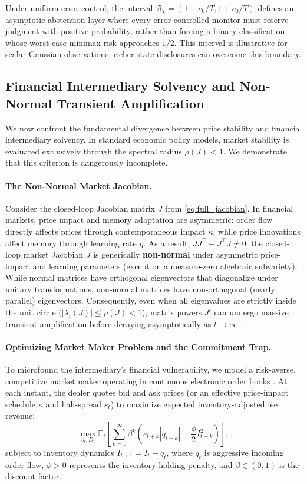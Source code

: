\documentclass[12pt]{article}
\theoremstyle{definition}
\theoremstyle{remark}
\begin{document}
Under uniform error control, the interval $\mathcal{B}_T = (1 - c_0/T, 1 + c_0/T)$ defines an asymptotic abstention layer where every error-controlled monitor must reserve judgment with positive probability, rather than forcing a binary classification whose worst-case minimax risk approaches $1/2$. This interval is illustrative for scalar Gaussian observations; richer state disclosures can overcome this boundary.\label{fig:abstention_zone}
\subsection{Financial Intermediary Solvency and Non-Normal Transient Amplification}
We now confront the fundamental divergence between price stability and financial intermediary solvency. In standard economic policy models, market stability is evaluated exclusively through the spectral radius $\rho(J) < 1$. We demonstrate that this criterion is dangerously incomplete.

\paragraph{The Non-Normal Market Jacobian.}
Consider the closed-loop Jacobian matrix $J$ from \eqref{eq:full_jacobian}. In financial markets, price impact and memory adaptation are asymmetric: order flow directly affects prices through contemporaneous impact $\kappa$, while price innovations affect memory through learning rate $\eta$. As a result, $J J^\top - J^\top J \neq 0$: the closed-loop market Jacobian $J$ is generically \textbf{non-normal} under asymmetric price-impact and learning parameters (except on a measure-zero algebraic subvariety). While normal matrices have orthogonal eigenvectors that diagonalize under unitary transformations, non-normal matrices have non-orthogonal (nearly parallel) eigenvectors. Consequently, even when all eigenvalues are strictly inside the unit circle ($|\lambda_i(J)| \le \rho(J) < 1$), matrix powers $J^t$ can undergo massive transient amplification before decaying asymptotically as $t \to \infty$ \citep{trefethen2005spectra}.

\paragraph{Optimizing Market Maker Problem and the Commitment Trap.}
To microfound the intermediary's financial vulnerability, we model a risk-averse, competitive market maker operating in continuous electronic order books \citep{ho1981optimal,grossman1988liquidity,avellaneda2008high,menkveld2013}. At each instant, the dealer quotes bid and ask prices (or an effective price-impact schedule $\kappa$ and half-spread $s_t$) to maximize expected inventory-adjusted fee revenue:
\begin{equation}
\max_{s_t, D_t} \mathbb{E}_t \left[ \sum_{k=0}^\infty \beta^k \left( s_{t+k} |q_{t+k}| - \frac{\phi}{2} I_{t+k}^2 \right) \right],
\label{eq:dealer_optimization}
\end{equation}
subject to inventory dynamics $I_{t+1} = I_t - q_t$, where $q_t$ is aggressive incoming order flow, $\phi > 0$ represents the inventory holding penalty, and $\beta \in (0, 1)$ is the discount factor. 
\end{document}
